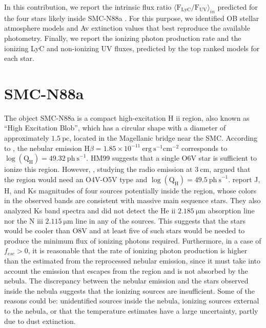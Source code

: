 \documentclass[baaa]{baaa}
\begin{document}
In this contribution, we report the intrinsic flux ratio 
$\langle \mathrm{F_{LyC}/F_{UV}}\rangle_{in}$ predicted for the four stars likely inside SMC-N88a \citep{testor2010}. For this purpose, we identified OB stellar atmosphere models and Av extinction values that best reproduce the available photometry. Finally, we report the ionizing photon production rate and the ionizing LyC and non-ionizing UV fluxes, predicted by the top ranked models for each star.

\section{SMC-N88a}

The object SMC-N88a is a compact high-excitation  H {\sc ii} region, also known as ``High Excitation Blob'', which has a circular shape with a diameter of approximately $1.5~\mathrm{pc}$, located in the Magellanic bridge near the SMC.
According to \citet[][HM99 hereafter]{hm1999_n88},
the nebular emission
H$\beta = 1.85\times 10^{-11}~\mathrm{erg\ s}^{-1} \mathrm{cm}^{-2}$ corresponds to $\log(\mathrm{Q_H})= 49.32 ~\mathrm{ph\ s}^{-1}$.
HM99 suggests that a single O6V star is sufficient to ionize this region. However, \citet{Indebetouw2004}, studying the radio emission at $3 ~\mathrm{cm}$, argued that the region would need an O4V-O5V type and $\log(\mathrm{Q_H})= 49.5 ~\mathrm{ph\ s}^{-1}$.
\citet{testor2010} report J, H, and Ks magnitudes of four sources potentially inside the region, whose colors in the observed bands are consistent with massive main sequence stars. They also analyzed Ks band spectra and did not detect the He {\sc ii} $2.185 ~\mathrm{ \mu m}$ absorption line nor the N {\sc iii} $2.115~\mathrm{ \mu m}$ line in any of the sources. This suggests that the stars would be cooler than O8V and at least five of such stars would be needed to produce the minimum flux of ionizing photons required. Furthermore, in a case of $f_{esc} > 0$, it is reasonable that the rate of ionizing photon production is higher than the estimated from the reprocessed nebular emission, since it must take into account the emission that escapes from the region and is not absorbed by the nebula. The discrepancy between the nebular emission and the stars observed inside the nebula suggests that the ionizing sources are insufficient. Some of the reasons could be: unidentified sources inside the nebula, ionizing sources external to the nebula, or that the temperature estimates have a large uncertainty, partly due to dust extinction.
\end{document}
